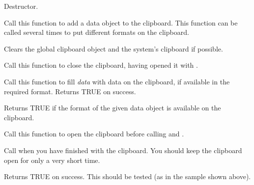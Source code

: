 

Destructor.

\label{wxclipboardadddata}


Call this function to add a data object to the clipboard. This function can be called several times
to put different formats on the clipboard.

\label{wxclipboardclear}


Clears the global clipboard object and the system's clipboard if possible.

\label{wxclipboardclose}


Call this function to close the clipboard, having opened it with .

\label{wxclipboardgetdata}


Call this function to fill {\it data} with data on the clipboard, if available in the required
format. Returns TRUE on success.

\label{wxclipboardissupported}


Returns TRUE if the format of the given data object is available on the clipboard.

\label{wxclipboardopen}


Call this function to open the clipboard before calling  
and .

Call  when you have finished with the clipboard. You
should keep the clipboard open for only a very short time.

Returns TRUE on success. This should be tested (as in the sample shown above).

\label{wxclipboardsetdata}

